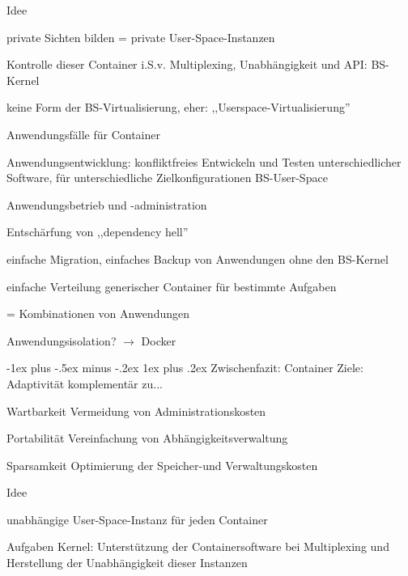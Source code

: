 \documentclass[a4paper]{article}
\makeatletter
\renewcommand{\subsubsection}{\@startsection{subsubsection}{3}{0mm}%
 {-1ex plus -.5ex minus -.2ex}%
 {1ex plus .2ex}%
 {\normalfont\small\bfseries}}
\makeatother
\begin{document}
\begin{multicols}{3}
    Idee
    \begin{itemize*}
        \item private Sichten bilden = private User-Space-Instanzen %
        \item Kontrolle dieser Container i.S.v. Multiplexing, Unabhängigkeit und API: BS-Kernel
        \item keine Form der BS-Virtualisierung, eher: ,,Userspace-Virtualisierung''
    \end{itemize*}

    Anwendungsfälle für Container
    \begin{itemize*}
        \item Anwendungsentwicklung:  konfliktfreies Entwickeln und Testen unterschiedlicher Software, für unterschiedliche Zielkonfigurationen BS-User-Space
        \item Anwendungsbetrieb und -administration
        \begin{itemize*}
            \item Entschärfung von ,,dependency hell''
            \item einfache Migration, einfaches Backup von Anwendungen ohne den BS-Kernel
            \item einfache Verteilung generischer Container für bestimmte Aufgaben
            \item[=] Kombinationen von Anwendungen
        \end{itemize*}
        \item Anwendungsisolation? $\rightarrow$ Docker
    \end{itemize*}

    \subsubsection{Zwischenfazit: Container}
    Ziele: Adaptivität komplementär zu...
    \begin{description*}
        \item[Wartbarkeit] Vermeidung von Administrationskosten%
        \item[Portabilität] Vereinfachung von Abhängigkeitsverwaltung
        \item[Sparsamkeit] Optimierung der Speicher-und Verwaltungskosten%
    \end{description*}

    Idee
    \begin{itemize*}
        \item unabhängige User-Space-Instanz für jeden Container
        \item Aufgaben Kernel: Unterstützung der Containersoftware bei Multiplexing und Herstellung der Unabhängigkeit dieser Instanzen
    \end{itemize*}


\end{multicols}
\end{document}
